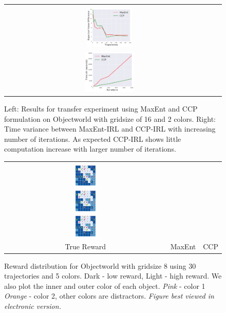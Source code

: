 \documentclass{article}
\def\MSHangBox#1{%
\begin{minipage}[t]{\textwidth}%
\begin{tabbing} %
~\\[-\baselineskip] %
#1 %
\end{tabbing}%
\end{minipage}} %
\begin{document}
\begin{figure}[t]
\centering
  \begin{tabular}{cc}
    \MSHangBox{\includegraphics[width=0.22\textwidth]{images/objectworld/transfer/ccp_no_var_maxent_no_var.pdf}}
    \MSHangBox{\includegraphics[width=0.24\textwidth]{images/objectworld/timeit_maxent_vs_ccp_grid_16_per_iter.pdf}}
  \end{tabular}
    \caption{Left: Results for transfer experiment using MaxEnt and CCP formulation on Objectworld with gridsize of 16 and 2 colors. Right: Time variance between MaxEnt-IRL and CCP-IRL with increasing number of iterations. As expected CCP-IRL shows little computation increase with larger number of iterations.}
    \label{fig:img_objectworld_maxent_vs_ccp_time_results}
\end{figure}

\begin{figure}[t]
\centering
  \begin{tabular}{ccc}
    \MSHangBox{\includegraphics[width=0.13\textwidth]{images/objectworld/grid_8_object_20_color_5/reward_map/true_reward_trim.pdf}}&
    \MSHangBox{\includegraphics[width=0.13\textwidth]{images/objectworld/grid_8_object_20_color_5/reward_map/maxent_reward_trim.pdf}}&
    \MSHangBox{\includegraphics[width=0.13\textwidth]{images/objectworld/grid_8_object_20_color_5/reward_map/ccp_reward_trim.pdf}} \\
    True Reward & MaxEnt & CCP \\
    \end{tabular}
    \caption{ Reward distribution for Objectworld with gridsize 8 using 30 trajectories and 5 colors. Dark - low reward, Light - high reward. We also plot the inner and outer color of each object. \textit{Pink} - color 1 \textit{Orange} - color 2, other colors are distractors. \textit{Figure best viewed in electronic version.} }
    \label{fig:img_reward_map_objectworld}
\end{figure}
\end{document}
